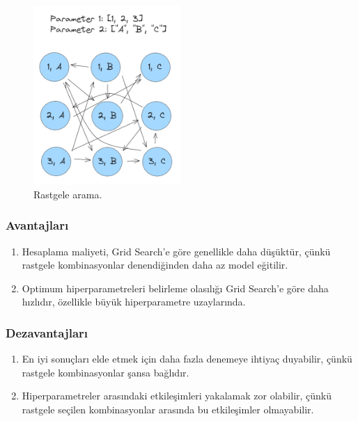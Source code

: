 \begin{figure}[h]
    \centering
    \includegraphics[width=0.5\textwidth]{images/Random_Search.png}
    \caption{Rastgele arama.}
    \label{fig:enter-label}
\end{figure}

\subsubsection{Avantajları}
\begin{enumerate}
    \item Hesaplama maliyeti, Grid Search'e göre genellikle daha düşüktür, çünkü rastgele kombinasyonlar denendiğinden daha az model eğitilir.
    \item Optimum hiperparametreleri belirleme olasılığı Grid Search'e göre daha hızlıdır, özellikle büyük hiperparametre uzaylarında.
\end{enumerate}

\subsubsection{Dezavantajları}
\begin{enumerate}
    \item En iyi sonuçları elde etmek için daha fazla denemeye ihtiyaç duyabilir, çünkü rastgele kombinasyonlar şansa bağlıdır.
    \item Hiperparametreler arasındaki etkileşimleri yakalamak zor olabilir, çünkü rastgele seçilen kombinasyonlar arasında bu etkileşimler olmayabilir.
\end{enumerate}

